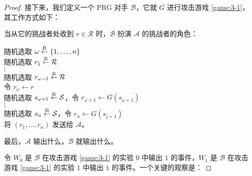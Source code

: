 \begin{proof}
接下来，我们定义一个 PRG 对手 $\mathcal B$，它就 $G$ 进行攻击游戏 \ref{game:3-1}，其工作方式如下：

\vspace*{10pt}

\hspace*{5pt} 当从它的挑战者处收到 $r\in\mathcal R$ 时，$\mathcal B$ 扮演 $\mathcal A$ 的挑战者的角色：

\vspace*{5pt}

\hspace*{28.5pt} 随机选取 $\omega\overset{\rm R}\leftarrow\{1,\dots,n\}$\\
\hspace*{50pt} 随机选取 $r_1\overset{\rm R}\leftarrow\mathcal R$\\
\hspace*{74pt} $\vdots$\\
\hspace*{50pt} 随机选取 $r_{\omega-1}\overset{\rm R}\leftarrow\mathcal R$\\
\hspace*{50pt} 令 $r_{\omega}\leftarrow r$\\
\hspace*{50pt} 随机选取 $s_{\omega+1}\overset{\rm R}\leftarrow\mathcal{S}$，令 $r_{\omega+1}\leftarrow G(s_{\omega+1})$\\
\hspace*{74pt} $\vdots$\\
\hspace*{50pt} 随机选取 $s_{n}\overset{\rm R}\leftarrow\mathcal{S}$，令 $r_{n}\leftarrow G(s_{j+1})$\\
\hspace*{50pt} 将 $(r_1,\dots,r_n)$ 发送给 $\mathcal A$。

\vspace*{5pt}

\hspace*{5pt} 最后，$\mathcal A$ 输出什么，$\mathcal B$ 就输出什么。

\vspace*{10pt}

令 $W_0$ 是 $\mathcal B$ 在攻击游戏 \ref{game:3-1} 的实验 $0$ 中输出 $1$ 的事件，$W_1$ 是 $\mathcal B$ 在攻击游戏 \ref{game:3-1} 的实验 $1$ 中输出 $1$ 的事件。一个关键的观察是：


\end{proof}
